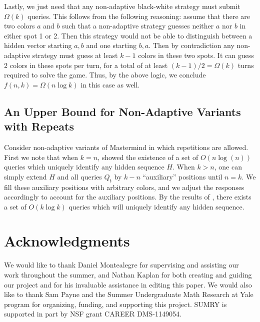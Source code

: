 \documentclass[12pt, a4paper]{article}
\begin{document}
Lastly, we just need that any non-adaptive black-white strategy must submit $\Omega(k)$ queries. This follows from the following reasoning: assume that there are two colors $a$ and $b$ such that a non-adaptive strategy guesses neither $a$ nor $b$ in either spot 1 or 2. Then this strategy would not be able to distinguish between a hidden vector starting $a,b$ and one starting $b,a$. Then by contradiction any non-adaptive strategy must guess at least $k-1$ colors in these two spots. It can guess 2 colors in these spots per turn, for a total of at least $(k-1)/2 = \Omega(k)$ turns required to solve the game. Thus, by the above logic, we conclude $f(n,k) = \Omega(n \log k)$ in this case as well.

\subsection{An Upper Bound for Non-Adaptive Variants with Repeats}
Consider non-adaptive variants of Mastermind in which repetitions are allowed. First we note that when $k=n$, \cite{DS13} showed the existence of a set of $O(n \log(n))$ queries which uniquely identify any hidden sequence $H$. When $k > n$, one can simply extend $H$ and all queries $Q_t$ by $k - n$ ``auxiliary'' positions until $n = k$. We fill these auxiliary positions with arbitrary colors, and we adjust the responses accordingly to account for the auxiliary positions. By the results of \cite{DS13}, there exists a set of $O(k \log k)$ queries which will uniquely identify any hidden sequence.

\section{Acknowledgments}
We would like to thank Daniel Montealegre for supervising and assisting our work throughout the summer, and Nathan Kaplan for both creating and guiding our project and for his invaluable assistance in editing this paper. 
 We would also like to thank Sam Payne and the Summer Undergraduate Math Research at Yale program for organizing, funding, and supporting this project. SUMRY is supported in part by NSF grant CAREER DMS-1149054.
\clearpage


\end{document}
